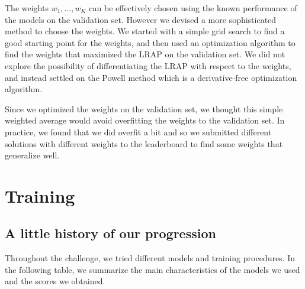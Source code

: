 \documentclass[switch, 12pt]{article}
\begin{document}
\begin{multicols}{2}
    The weights $w_1,\dots,w_K$ can be effectively chosen using the known performance of the models on the validation set. However we devised a more sophisticated method to choose the weights. We started with a simple grid search to find a good starting point for the weights, and then used an optimization algorithm to find the weights that maximized the LRAP on the validation set. We did not explore the possibility of differentiating the LRAP with respect to the weights, and instead settled on the Powell method \cite{powell-1964} which is a derivative-free optimization algorithm.

    Since we optimized the weights on the validation set, we thought this simple weighted average would avoid overfitting the weights to the validation set. In practice, we found that we did overfit a bit and so we submitted different solutions with different weights to the leaderboard to find some weights that generalize well.


    \section{Training}

    \subsection{A little history of our progression}
    Throughout the challenge, we tried different models and training procedures. In the following table, we summarize the main characteristics of the models we used and the scores we obtained.


\end{multicols}
\end{document}
